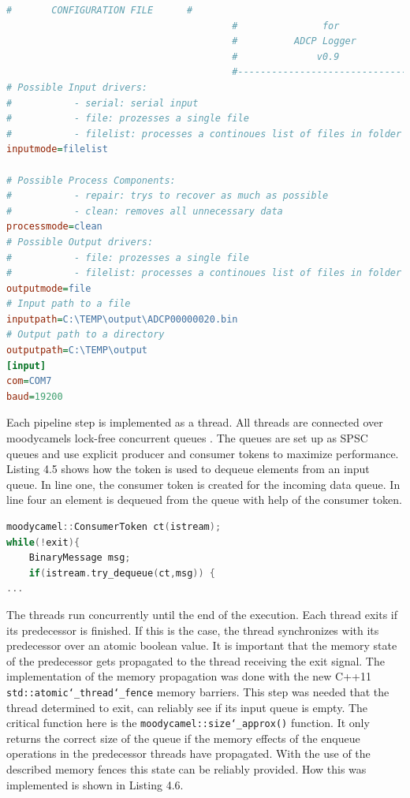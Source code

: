 \begin{lstlisting}[language={Ini}, caption=A Snippet of a configuration file for the ADCP logger application.]
                                        #       CONFIGURATION FILE      #
                                        #               for             #
                                        #          ADCP Logger          #
                                        #              v0.9             #
                                        #-------------------------------#
# Possible Input drivers:
#           - serial: serial input
#           - file: prozesses a single file
#           - filelist: processes a continoues list of files in folder
inputmode=filelist

# Possible Process Components:
#           - repair: trys to recover as much as possible
#           - clean: removes all unnecessary data
processmode=clean
# Possible Output drivers:
#           - file: prozesses a single file
#           - filelist: processes a continoues list of files in folder
outputmode=file
# Input path to a file
inputpath=C:\TEMP\output\ADCP00000020.bin
# Output path to a directory
outputpath=C:\TEMP\output
[input]
com=COM7
baud=19200
\end{lstlisting}

Each pipeline step is implemented as a thread. All threads are connected over moodycamels lock-free concurrent queues \cite{moody}. The queues are set up as SPSC queues and use explicit producer and consumer tokens to maximize performance. Listing 4.5 shows how the token is used to dequeue elements from an input queue. In line one, the consumer token is created for the incoming data queue. In line four an element is dequeued from the queue with help of the consumer token.

\begin{lstlisting}[language=C++, caption=Code snippet showing the use of consumer tokens.]
moodycamel::ConsumerToken ct(istream);
while(!exit){
    BinaryMessage msg;
    if(istream.try_dequeue(ct,msg)) {
...
\end{lstlisting}

The threads run concurrently until the end of the execution. Each thread exits if its predecessor is finished. If this is the case, the thread synchronizes with its predecessor over an atomic boolean value. It is important that the memory state of the predecessor gets propagated to the thread receiving the exit signal. The implementation of the memory propagation was done with the new C++11 \texttt{std::atomic\char`_thread\char`_fence} memory barriers. This step was needed that the thread determined to exit, can reliably see if its input queue is empty. The critical function here is the \texttt{moodycamel::size\char`_approx()} function. It only returns the correct size of the queue if the memory effects of the enqueue operations in the predecessor threads have propagated. With the use of the described memory fences this state can be reliably provided. How this was implemented is shown in Listing 4.6.


